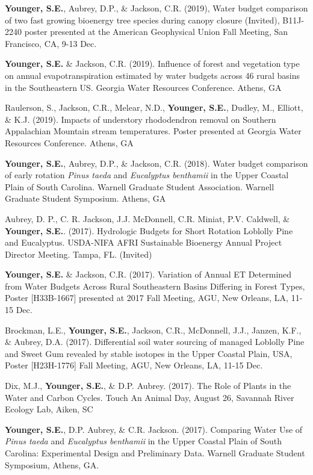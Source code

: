\documentclass[10pt,letterpaper]{article}
\begin{document}
\begin{hangparas}{.25in}{1}
		\textbf{Younger, S.E.}, Aubrey, D.P., \& Jackson, C.R. (2019), Water budget comparison of two fast growing bioenergy tree species during canopy closure (Invited), B11J-2240 poster presented at the American Geophysical Union Fall Meeting, San Francisco, CA, 9-13 Dec.
		
		\textbf{Younger, S.E.} \& Jackson, C.R. (2019). Influence of forest and vegetation type on annual evapotranspiration estimated by water budgets across 46 rural basins in the Southeastern US. Georgia Water Resources Conference. Athens, GA
		
		Raulerson, S., Jackson, C.R., Melear, N.D., \textbf{Younger, S.E.}, Dudley, M., Elliott, \& K.J. (2019). Impacts of understory rhododendron removal on Southern Appalachian Mountain stream temperatures. Poster presented at Georgia Water Resources Conference. Athens, GA
		
		\textbf{Younger, S.E.}, Aubrey, D.P., \& Jackson, C.R. (2018). Water budget comparison of early rotation \textit{Pinus taeda} and \textit{Eucalyptus benthamii} in the Upper Coastal Plain of South Carolina. Warnell Graduate Student Association. Warnell Graduate Student Symposium. Athens, GA
		
		Aubrey, D. P., C. R. Jackson, J.J. McDonnell, C.R. Miniat, P.V. Caldwell, \& \textbf{Younger, S.E.}. (2017). Hydrologic Budgets for Short Rotation Loblolly Pine and Eucalyptus. USDA-NIFA AFRI Sustainable Bioenergy Annual Project Director Meeting. Tampa, FL. (Invited)
		
		\textbf{Younger, S.E.} \& Jackson, C.R. (2017). Variation of Annual ET Determined from Water Budgets Across Rural Southeastern Basins Differing in Forest Types, Poster [H33B-1667] presented at 2017 Fall Meeting, AGU, New Orleans, LA, 11-15 Dec.
		
		Brockman, L.E., \textbf{Younger, S.E.}, Jackson, C.R., McDonnell, J.J., Janzen, K.F., \& Aubrey, D.A. (2017). Differential soil water sourcing of managed Loblolly Pine and Sweet Gum revealed by stable isotopes in the Upper Coastal Plain, USA, Poster [H23H-1776] Fall Meeting, AGU, New Orleans, LA, 11-15 Dec.
		
		Dix, M.J., \textbf{Younger, S.E.}, \& D.P. Aubrey. (2017). The Role of Plants in the Water and Carbon Cycles. Touch An Animal Day, August 26, Savannah River Ecology Lab, Aiken, SC
		
		\textbf{Younger, S.E.}, D.P. Aubrey, \& C.R. Jackson. (2017). Comparing Water Use of \textit{Pinus taeda} and \textit{Eucalyptus benthamii} in the Upper Coastal Plain of South Carolina: Experimental Design and Preliminary Data. Warnell Graduate Student Symposium, Athens, GA. 
		

\end{hangparas}
\end{document}
